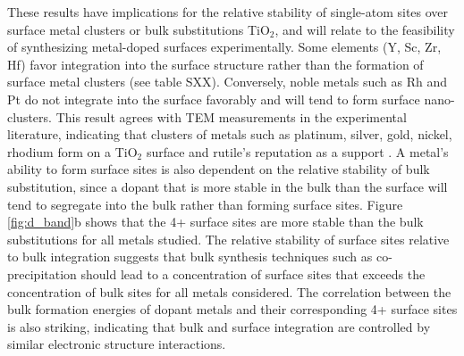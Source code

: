 
These results have implications for the relative stability of single-atom sites over surface metal clusters or bulk substitutions TiO$_2$, and will relate to the feasibility of synthesizing metal-doped surfaces experimentally. Some elements (Y, Sc, Zr, Hf) favor integration into the surface structure rather than the formation of surface metal clusters (see table SXX). Conversely, noble metals such as Rh and Pt do not integrate into the surface favorably and will tend to form surface nano-clusters. This result agrees with TEM measurements in the experimental literature, indicating that clusters of metals such as platinum, silver, gold, nickel, rhodium form on a TiO$_2$ surface \cite{Iliev_2006, Dung_Dang_2010, Shinde_2013, Yu_2019} and rutile's reputation as a support \cite{Bagheri_2014}. A metal's ability to form surface sites is also dependent on the relative stability of bulk substitution, since a dopant that is more stable in the bulk than the surface will tend to segregate into the bulk rather than forming surface sites. Figure \ref{fig:d_band}b shows that the 4+ surface sites are more stable than the bulk substitutions for all metals studied. The relative stability of surface sites relative to bulk integration suggests that bulk synthesis techniques such as co-precipitation should lead to a concentration of surface sites that exceeds the concentration of bulk sites for all metals considered.
The correlation between the bulk formation energies of dopant metals and their corresponding 4+ surface sites is also striking, indicating that bulk and surface integration are controlled by similar electronic structure interactions. %


